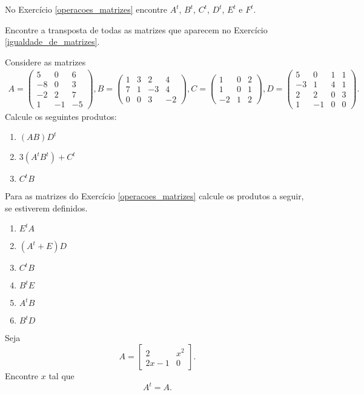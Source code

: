 \documentclass[12pt]{exam}
\begin{document}
    \vspace{.3cm}

    \questao{} No Exercício \ref{operacoes_matrizes} encontre $A^t$, $B^t$, $C^t$, $D^t$, $E^t$ e $F^t$.

    \vspace{.3cm}

    \questao{} Encontre a transposta de todas as matrizes que aparecem no Exercício \ref{igualdade_de_matrizes}.

    \vspace{.3cm}

    \questao{} Considere as matrizes
    \begin{align*}
        A = \begin{pmatrix}5 & 0 & 6\\-8 & 0 & 3\\-2 & 2 & 7\\1 & -1 & -5\end{pmatrix},
        B = \begin{pmatrix}1 & 3 & 2 & 4\\7 & 1 & -3 & 4\\0 & 0 & 3 & -2\end{pmatrix},
        C = \begin{pmatrix}1 & 0 & 2\\1 & 0 & 1\\-2 & 1 & 2\end{pmatrix},
        D = \begin{pmatrix}5 & 0 & 1 & 1\\-3 & 1 & 4 & 1\\2 & 2 & 0 & 3\\1 & -1 & 0 & 0\end{pmatrix}.
    \end{align*}
    Calcule os seguintes produtos:
    \begin{enumerate}
        \item $(AB)D^t$
        \item $3(A^tB^t) + C^t$
        \item $C^tB$
    \end{enumerate}

    \vspace{.3cm}
    
    \questao{}Para as matrizes do Exercício \ref{operacoes_matrizes} calcule os produtos a seguir, se estiverem definidos.
    \begin{enumerate}
        \item $E^tA$
        \item $(A^t + E)D$
        \item $C^tB$
        \item $B^tE$
        \item $A^tB$
        \item $B^tD$
    \end{enumerate}
    \questao{} Seja
    \[
        A = \begin{bmatrix}2 & x^2\\2x - 1 & 0\end{bmatrix}.
    \]
    Encontre $x$ tal que
    \[
        A^t = A.
    \]
\end{document}
